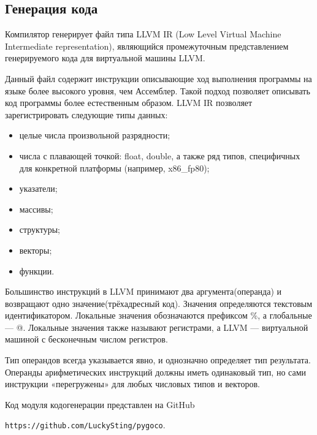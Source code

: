\subsection{Генерация кода}\label{subsec:codegen}
Компилятор генерирует файл типа LLVM IR (Low Level Virtual Machine Intermediate representation),
являющийся промежуточным представлением генерируемого кода для виртуальной машины LLVM.

Данный файл содержит инструкции описывающие ход выполнения программы на языке более высокого уровня, чем Ассемблер.
Такой подход позволяет описывать код программы более естественным образом.
LLVM IR позволяет зарегистрировать следующие типы данных:
\begin{itemize}
    \item целые числа произвольной разрядности;
    \item числа с плавающей точкой: float, double, а также ряд типов,
    специфичных для конкретной платформы (например, x86\_fp80);
    \item указатели;
    \item массивы;
    \item структуры;
    \item векторы;
    \item функции.
\end{itemize}

Большинство инструкций в LLVM принимают два аргумента(операнда) и возвращают одно значение(трёхадресный код).
Значения определяются текстовым идентификатором.
Локальные значения обозначаются префиксом \%, а глобальные — @.
Локальные значения также называют регистрами, а LLVM — виртуальной машиной с бесконечным числом регистров.

Тип операндов всегда указывается явно, и однозначно определяет тип результата.
Операнды арифметических инструкций должны иметь одинаковый тип, но сами инструкции «перегружены» для любых числовых типов и векторов.

Код модуля кодогенерации представлен на GitHub

\texttt{https://github.com/LuckySting/pygoco}.
